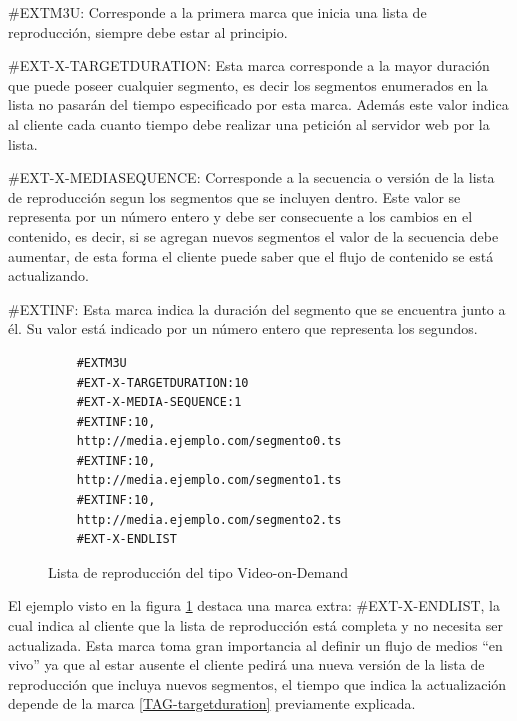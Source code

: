 \begin{prop}

\item \#EXTM3U: Corresponde a la primera marca que inicia una lista de reproducción, siempre debe estar al principio.

\item \#EXT-X-TARGETDURATION: Esta marca corresponde a la mayor duración que puede poseer cualquier segmento, es decir los segmentos enumerados en la lista no pasarán del tiempo especificado por esta marca.
Además este valor indica al cliente cada cuanto tiempo debe realizar una petición al servidor web por la lista.
\label{TAG-targetduration}

\item \label{TAG-mediasequence} \#EXT-X-MEDIASEQUENCE: Corresponde a la secuencia o versión de la lista de reproducción segun los segmentos que se incluyen dentro. Este valor se representa por un número entero y debe ser consecuente a los cambios en el contenido, es decir, si se agregan nuevos segmentos el valor de la secuencia debe aumentar, de esta forma el cliente puede saber que el flujo de contenido se está actualizando.


\item \label{TAG-extinfint} \#EXTINF: Esta marca indica la duración del segmento que se encuentra junto a él. Su valor está indicado por un número entero que representa los segundos.\\
\end{prop}

\begin{figure}[h!]
	\centering
	\begin{lstlisting}
	#EXTM3U
	#EXT-X-TARGETDURATION:10
	#EXT-X-MEDIA-SEQUENCE:1
	#EXTINF:10,
	http://media.ejemplo.com/segmento0.ts
	#EXTINF:10,
	http://media.ejemplo.com/segmento1.ts
	#EXTINF:10,
	http://media.ejemplo.com/segmento2.ts
	#EXT-X-ENDLIST
	\end{lstlisting}
	\caption{Lista de reproducción del tipo Video-on-Demand}
	\label{ejemploM3U8}	
\end{figure}			

El ejemplo visto en la figura \ref{ejemploM3U8} destaca una marca extra: \#EXT-X-ENDLIST, la cual indica al cliente que la lista de reproducción está completa y no necesita ser actualizada. Esta marca toma gran importancia al definir un flujo de medios ``en vivo'' ya que al estar ausente el cliente pedirá una nueva versión de la lista de reproducción que incluya nuevos segmentos, el tiempo que indica la actualización depende de la marca \ref{TAG-targetduration} previamente explicada.\\

